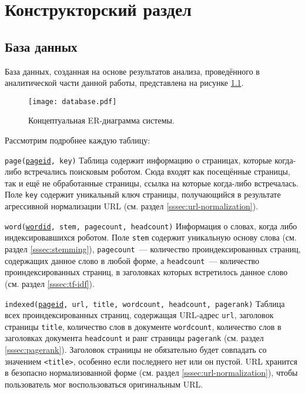 \chapter{Конструкторский раздел}
\section{База данных}
База данных, созданная на основе результатов анализа, проведённого в аналитической части данной работы, представлена на рисунке \ref{fig:database}.

\begin{figure}[h]
  \centering
  \texttt{[image: database.pdf]}
  \caption{Концептуальная ER-диаграмма системы.}
  \label{fig:database}
\end{figure}

Рассмотрим подробнее каждую таблицу:

\begin{definition}{\texttt{page(\underline{pageid}, key)}}
  Таблица содержит информацию о страницах, которые когда-либо встречались поисковым роботом. Сюда входят как посещённые страницы, так и ещё не обработанные страницы, ссылка на которые когда-либо встречалась. Поле \verb|key| содержит уникальный ключ страницы, получающийся в результате агрессивной нормализации URL (см. раздел \ref{sssec:url-normalization}).
\end{definition}

\begin{definition}{\texttt{word(\underline{wordid}, stem, pagecount, headcount)}}
  Информация о словах, когда либо индексировавшихся роботом. Поле \verb|stem| содержит уникальную основу слова (см. раздел \ref{sssec:stemming}), \verb|pagecount|~--- количество проиндексированных страниц, содержащих данное слово в любой форме, а \verb|headcount|~--- количество проиндексированных страниц, в заголовках которых встретилось данное слово (см. раздел \ref{sssec:tf-idf}).
\end{definition}

\begin{definition}{\texttt{indexed(\underline{pageid}, url, title, wordcount, headcount, pagerank)}}
  Таблица всех проиндексированных страниц, содержащая URL-адрес \verb|url|, заголовок страницы \verb|title|, количество слов в документе \verb|wordcount|, количество слов в заголовках документа \verb|headcount| и ранг страницы \verb|pagerank| (см. раздел \ref{sssec:pagerank}). Заголовок страницы не обязательно будет совпадать со значением \verb|<title>|, особенно если последнего нет или он пустой. URL хранится в безопасно нормализованной форме (см. раздел \ref{sssec:url-normalization}), чтобы пользователь мог воспользоваться оригинальным URL.
\end{definition}

